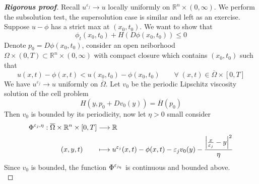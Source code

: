 \documentclass[12pt, oneside]{amsart}  	%
\begin{document}
\begin{proof}[\textbf{Rigorous proof}] Recall $u^{\varepsilon_j}\longrightarrow u$ locally uniformly on $\mathbb{R}^n\times (0,\infty)$. We perform the subsolution test, the supersolution case is similar and left as an exercise. Suppose $u-\phi$ has a strict max at $(x_0, t_0)$. We want to show that
\begin{equation*}
\phi_t(x_0,t_0) + H\left(D\phi(x_0,t_0)\right) \leq 0
\end{equation*}
Denote $p_0 = D\phi(x_0,t_0)$, consider an open neiborhood $\Omega\times (0,T) \subset \mathbb{R}^n \times (0,\infty)$ with compact closure which contains $(x_0,t_0)$ such that
\begin{equation*}
u(x,t) - \phi(x,t) < u\left(x_0,t_0\right)-\phi\left(x_0,t_0\right) \qquad\forall\;(x,t)\in \overline{\Omega}\times [0,T]
\end{equation*}
We have $u^{\varepsilon_j} \longrightarrow u$ uniformly on $\overline{\Omega}$. Let $v_0$ be the periodic Lipschitz viscosity solution of the cell problem
\begin{equation*}
H(y, p_0+Dv_0(y)) = \overline{H}(p_0)
\end{equation*}
Then $v_0$ is bounded by its periodicity, now let $\eta >0$ small consider
\begin{align*}
\Phi^{\varepsilon_j,\eta}: \overline{\Omega}\times\mathbb{R}^n\times[0,T] &\longrightarrow \mathbb{R}\\
(x,y,t)\qquad&\longmapsto u^{\varepsilon_j}(x,t) -  \phi(x,t) -\varepsilon_j v_0(y) - \frac{\left|\frac{x}{\varepsilon_j} - y\right|^2}{\eta}
\end{align*}
Since $v_0$ is bounded, the function $\Phi^{\varepsilon_{j_\eta}}$ is continuous and bounded above.\\


\end{proof}
\end{document}
